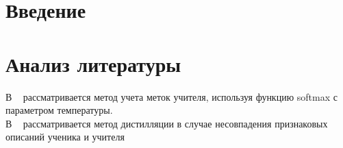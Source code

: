 \newpage


\section{Введение}


\section{Анализ литературы}

В ~\cite{Hinton2015} рассматривается метод учета меток учителя, используя функцию softmax с параметром температуры.\\
В ~\cite{Vapnik2016} рассматривается метод дистилляции в случае несовпадения признаковых описаний ученика и учителя\\
